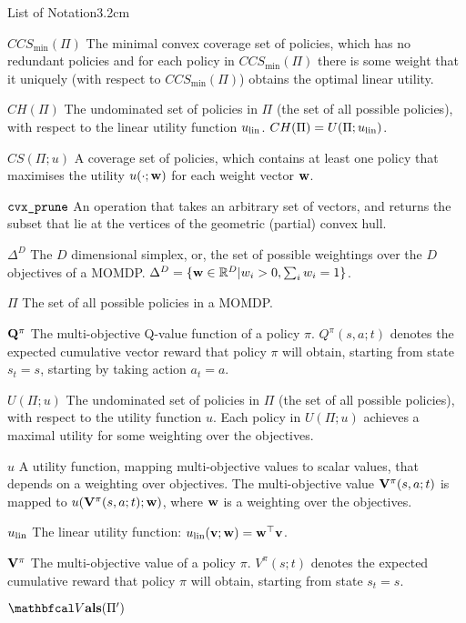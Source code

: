 \begin{mclistof}{List of Notation}{3.2cm}
    \item[$CCS_{\min}(\Pi)$]
        The minimal convex coverage set of policies, which has no redundant policies and for each policy in $CCS_{\min}(\Pi)$ there is some weight that it uniquely (with respect to $CCS_{\min}(\Pi)$) obtains the optimal linear utility.
    \item[$CH(\Pi)$] 
        The undominated set of policies in $\Pi$ (the set of all possible policies), with respect to the linear utility function $u_{{\textnormal{lin}}}$. $CH(\Pi)=U(\Pi;u_{{\textnormal{lin}}})$.
    \item[$CS(\Pi;u)$] 
        A coverage set of policies, which contains at least one policy that maximises the utility $u(\cdot;\mathbf{w})$ for each weight vector $\mathbf{w}$.
    \item[${\textnormal{\texttt{cvx\_prune}}}$] 
        An operation that takes an arbitrary set of vectors, and returns the subset that lie at the vertices of the geometric (partial) convex hull. 
    \item[$\Delta^D$] 
        The $D$ dimensional simplex, or, the set of possible weightings over the $D$ objectives of a MOMDP. $\Delta^D = \{\mathbf{w}\in\mathbb{R}^D|w_i > 0, \sum_i w_i = 1\}$.
    \item[$\Pi$] 
        The set of all possible policies in a MOMDP.
    \item[$\mathbf{Q}^{\pi}$]
        The multi-objective Q-value function of a policy $\pi$. $Q^{\pi}(s,a;t)$ denotes the expected cumulative vector reward that policy $\pi$ will obtain, starting from state $s_t=s$, starting by taking action $a_t=a$.
    \item[$U(\Pi;u)$] 
        The undominated set of policies in $\Pi$ (the set of all possible policies), with respect to the utility function $u$. Each policy in $U(\Pi;u)$ achieves a maximal utility for some weighting over the objectives.
    \item[$u$] 
        A utility function, mapping multi-objective values to scalar values, that depends on a weighting over objectives. The multi-objective value $\mathbf{V}^{\pi}(s,a;t)$ is mapped to $u(\mathbf{V}^{\pi}(s,a;t);\mathbf{w})$, where $\mathbf{w}$ is a weighting over the objectives.
    \item[$u_{{\textnormal{lin}}}$]
        The linear utility function: $u_{{\textnormal{lin}}}(\mathbf{v};\mathbf{w}) = \mathbf{w}^\top \mathbf{v}$.
    \item[$\mathbf{V}^{\pi}$]
        The multi-objective value of a policy $\pi$. $V^{\pi}(s;t)$ denotes the expected cumulative reward that policy $\pi$ will obtain, starting from state $s_t=s$.
    \item[$\valset(\Pi')$] 

\end{mclistof}
